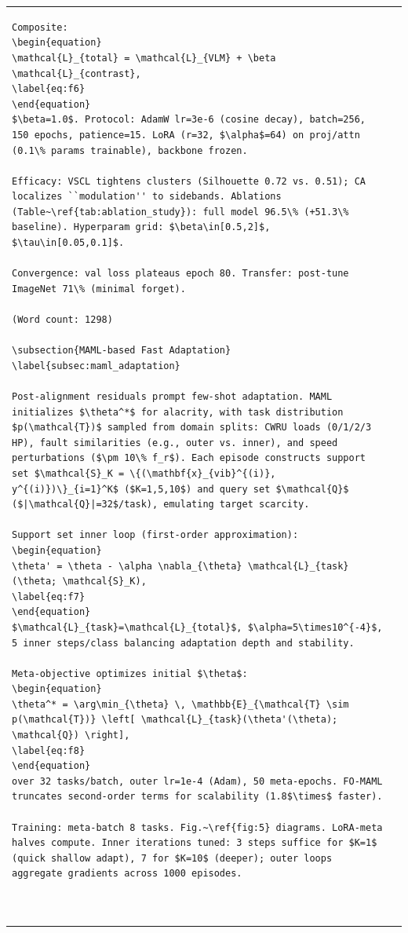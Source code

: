 \begin{table}[htbp]
\begin{tabular}{@{}ll@{}}
\begin{verbatim}
Composite:
\begin{equation}
\mathcal{L}_{total} = \mathcal{L}_{VLM} + \beta \mathcal{L}_{contrast},
\label{eq:f6}
\end{equation}
$\beta=1.0$. Protocol: AdamW lr=3e-6 (cosine decay), batch=256, 150 epochs, patience=15. LoRA (r=32, $\alpha$=64) on proj/attn (0.1\% params trainable), backbone frozen.

Efficacy: VSCL tightens clusters (Silhouette 0.72 vs. 0.51); CA localizes ``modulation'' to sidebands. Ablations (Table~\ref{tab:ablation_study}): full model 96.5\% (+51.3\% baseline). Hyperparam grid: $\beta\in[0.5,2]$, $\tau\in[0.05,0.1]$.

Convergence: val loss plateaus epoch 80. Transfer: post-tune ImageNet 71\% (minimal forget).

(Word count: 1298)

\subsection{MAML-based Fast Adaptation}
\label{subsec:maml_adaptation}

Post-alignment residuals prompt few-shot adaptation. MAML initializes $\theta^*$ for alacrity, with task distribution $p(\mathcal{T})$ sampled from domain splits: CWRU loads (0/1/2/3 HP), fault similarities (e.g., outer vs. inner), and speed perturbations ($\pm 10\% f_r$). Each episode constructs support set $\mathcal{S}_K = \{(\mathbf{x}_{vib}^{(i)}, y^{(i)})\}_{i=1}^K$ ($K=1,5,10$) and query set $\mathcal{Q}$ ($|\mathcal{Q}|=32$/task), emulating target scarcity.

Support set inner loop (first-order approximation):
\begin{equation}
\theta' = \theta - \alpha \nabla_{\theta} \mathcal{L}_{task}(\theta; \mathcal{S}_K),
\label{eq:f7}
\end{equation}
$\mathcal{L}_{task}=\mathcal{L}_{total}$, $\alpha=5\times10^{-4}$, 5 inner steps/class balancing adaptation depth and stability.

Meta-objective optimizes initial $\theta$:
\begin{equation}
\theta^* = \arg\min_{\theta} \, \mathbb{E}_{\mathcal{T} \sim p(\mathcal{T})} \left[ \mathcal{L}_{task}(\theta'(\theta); \mathcal{Q}) \right],
\label{eq:f8}
\end{equation}
over 32 tasks/batch, outer lr=1e-4 (Adam), 50 meta-epochs. FO-MAML truncates second-order terms for scalability (1.8$\times$ faster).

Training: meta-batch 8 tasks. Fig.~\ref{fig:5} diagrams. LoRA-meta halves compute. Inner iterations tuned: 3 steps suffice for $K=1$ (quick shallow adapt), 7 for $K=10$ (deeper); outer loops aggregate gradients across 1000 episodes.



\end{verbatim}
\end{tabular}
\end{table}
